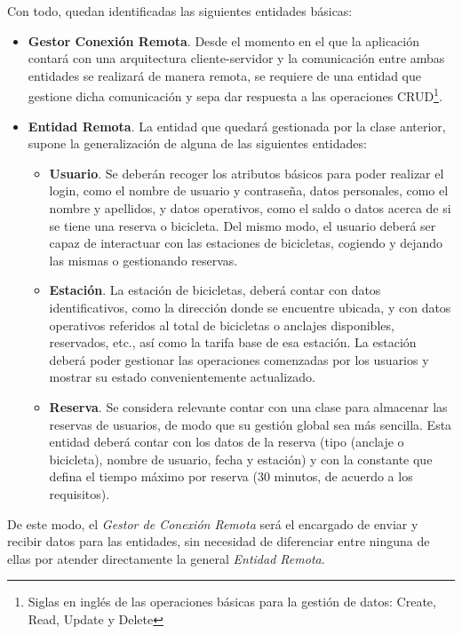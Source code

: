 Con todo, quedan identificadas las siguientes entidades básicas:

\begin{itemize}
	\item \textbf{Gestor Conexión Remota}. Desde el momento en el que la aplicación contará con una arquitectura cliente-servidor y la comunicación entre ambas entidades se realizará de manera remota, se requiere de una entidad que gestione dicha comunicación y sepa dar respuesta a las operaciones CRUD\footnote{Siglas en inglés de las operaciones básicas para la gestión de datos: Create, Read, Update y Delete}.
	\item \textbf{Entidad Remota}. La entidad que quedará gestionada por la clase anterior, supone la generalización de alguna de las siguientes entidades:
	\begin{itemize}
		\item \textbf{Usuario}. Se deberán recoger los atributos básicos para poder realizar el login, como el nombre de usuario y contraseña, datos personales, como el nombre y apellidos, y datos operativos, como el saldo o datos acerca de si se tiene una reserva o bicicleta. Del mismo modo, el usuario deberá ser capaz de interactuar con las estaciones de bicicletas, cogiendo y dejando las mismas o gestionando reservas.
		\item \textbf{Estación}. La estación de bicicletas, deberá contar con datos identificativos, como la dirección donde se encuentre ubicada, y con datos operativos referidos al total de bicicletas o anclajes disponibles, reservados, etc., así como la tarifa base de esa estación. La estación deberá poder gestionar las operaciones comenzadas por los usuarios y mostrar su estado convenientemente actualizado.
		\item \textbf{Reserva}. Se considera relevante contar con una clase para almacenar las reservas de usuarios, de modo que su gestión global sea más sencilla. Esta entidad deberá contar con los datos de la reserva (tipo (anclaje o bicicleta), nombre de usuario, fecha y estación) y con la constante que defina el tiempo máximo por reserva (30 minutos, de acuerdo a los requisitos).
	\end{itemize}
\end{itemize}

De este modo, el \emph{Gestor de Conexión Remota} será el encargado de enviar y recibir datos para las entidades, sin necesidad de diferenciar entre ninguna de ellas por atender directamente la general \emph{Entidad Remota}.

